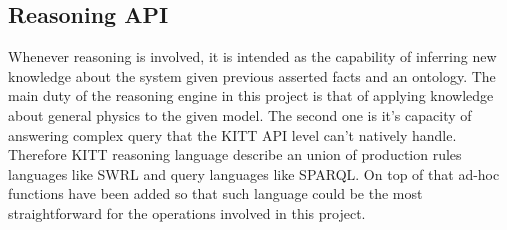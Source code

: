 \subsection{Reasoning API}\label{subsec:reasoning_api}
Whenever reasoning is involved, it is intended as the capability of inferring new knowledge about the system given previous asserted facts and an ontology. The main duty of the reasoning engine in this project is that of applying knowledge about general physics to the given model. The second one is it's capacity of answering complex query that the KITT API level can't natively handle. Therefore KITT reasoning language describe an union of production rules languages like SWRL\cite{swrl_reccomendation} and query languages like SPARQL\cite{sparql_reccomendation}. On top of that ad-hoc functions have been added so that such language could be the most straightforward for the operations involved in this project.
